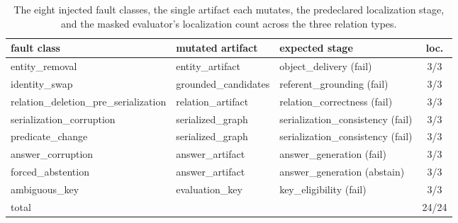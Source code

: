 \begin{table}[t]
  \centering\footnotesize
  \setlength{\tabcolsep}{6pt}
  \begin{tabular}{@{}lllc@{}}
    \toprule
    fault class & mutated artifact & expected stage & loc.\\
    \midrule
    entity\_removal & entity\_artifact & object\_delivery (fail) & 3/3\\
    identity\_swap & grounded\_candidates & referent\_grounding (fail) & 3/3\\
    relation\_deletion\_pre\_serialization & relation\_artifact & relation\_correctness (fail) & 3/3\\
    serialization\_corruption & serialized\_graph & serialization\_consistency (fail) & 3/3\\
    predicate\_change & serialized\_graph & serialization\_consistency (fail) & 3/3\\
    answer\_corruption & answer\_artifact & answer\_generation (fail) & 3/3\\
    forced\_abstention & answer\_artifact & answer\_generation (abstain) & 3/3\\
    ambiguous\_key & evaluation\_key & key\_eligibility (fail) & 3/3\\
    \midrule
    total & & & 24/24\\
    \bottomrule
  \end{tabular}
  \caption{The eight injected fault
  classes, the single artifact each mutates, the predeclared localization
  stage, and the masked evaluator's localization count across the three
  relation types.}
  \label{tab:faults}
\end{table}
